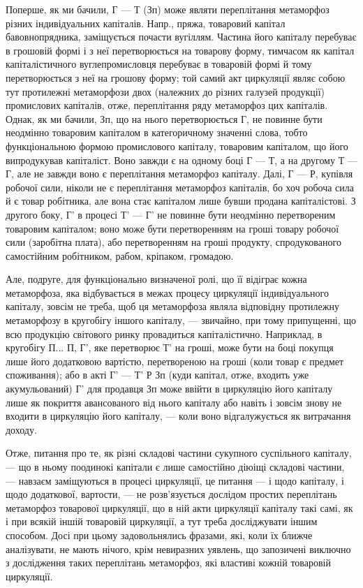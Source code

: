 Поперше, як ми бачили, Г — Т (Зп) може являти переплітання метаморфоз
різних індивідуальних капіталів. Напр., пряжа, товаровий капітал
бавовнопрядника, заміщується почасти вугіллям. Частина його капіталу
перебуває в грошовій формі і з неї перетворюється на товарову форму,
тимчасом як капітал капіталістичного вуглепромисловця перебуває в товаровій
формі й тому перетворюється з неї на грошову форму; той самий акт
циркуляції являє собою тут протилежні метаморфози двох (належних до
різних галузей продукції) промислових капіталів, отже, переплітання ряду
метаморфоз цих капіталів. Однак, як ми бачили, Зп, що на нього перетворюється
Г, не повинне бути неодмінно товаровим капіталом в категоричному
значенні слова, тобто функціональною формою промислового
капіталу, товаровим капіталом, що його випродукував капіталіст. Воно
завжди є на одному боці Г — Т, а на другому Т — Г, але не завжди
воно є переплітання метаморфоз капіталу. Далі, Г — Р, купівля робочої
сили, ніколи не є переплітання метаморфоз капіталів, бо хоч
робоча сила й є товар робітника, але вона стає капіталом лише
бувши продана капіталістові. З другого боку, Г' в процесі Т' — Г'
не повинне бути неодмінно перетвореним товаровим капіталом; воно
може бути перетворенням на гроші товару робочої сили (заробітна
плата), або перетворенням на гроші продукту, спродукованого самостійним
робітником, рабом, кріпаком, громадою.

Але, подруге, для функціонально визначеної ролі, що її відіграє
кожна метаморфоза, яка відбувається в межах процесу циркуляції індивідуального
капіталу, зовсім не треба, щоб ця метаморфоза являла відповідну
протилежну метаморфозу в кругобігу іншого капіталу, — звичайно,
при тому припущенні, що всю продукцію світового ринку провадиться
капіталістично. Наприклад, в кругобігу П... П, Г', яке перетворює Т'
на гроші, може бути на боці покупця лише його додатковою вартістю,
перетвореною на гроші (коли товар є предмет споживання); або в
акті Г' — Т' Р Зп (куди капітал, отже, входить уже акумульований) Г' для
продавця Зп може ввійти в циркуляцію його капіталу лише як покриття
авансованого від нього капіталу або навіть і зовсім знову не входити в
циркуляцію його капіталу, — коли воно відгалужується як витрачання доходу.

Отже, питання про те, як різні складові частини сукупного суспільного
капіталу, — що в ньому поодинокі капітали є лише самостійно
діюіщі складові частини, — навзаєм заміщуються в процесі циркуляції, це
питання — і щодо капіталу, і щодо додаткової, вартости, — не розв’язується
дослідом простих переплітань метаморфоз товарової циркуляції, що в
ній акти циркуляції капіталу такі самі, як і при всякій іншій товаровій
циркуляції, а тут треба досліджувати іншим способом. Досі при цьому
задовольнялись фразами, які, коли їх ближче аналізувати, не мають нічого,
крім невиразних уявлень, що запозичені виключно з дослідження таких
переплітань метаморфоз, які властиві кожній товаровій циркуляції.

